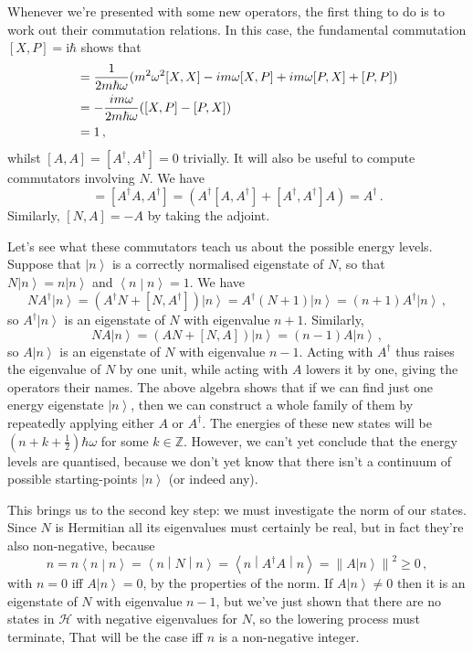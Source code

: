 \documentclass{article}
\theoremstyle{plain}\theoremheaderfont{\normalfont\itshape}\theorembodyfont{\rmfamily}\theoremseparator{.}\newtheorem*{rem}{Remark}\newtheorem*{ex}{Example}\newtheorem*{proof}{Proof}\newtheorem*{altp}{Alternative proof}
\theoremstyle{plain}\theoremheaderfont{\normalfont\bfseries}\theorembodyfont{\rmfamily}\theoremseparator{.}\newtheorem{thm}{Theorem}[section]\newtheorem{lem}[thm]{Lemma}\newtheorem{prop}[thm]{Proposition}\newtheorem*{cor}{Corollary}\newtheorem{defn}[thm]{Definition}\newtheorem{clm}[thm]{Claim}\newtheorem{clminproof}{Claim}
\theoremstyle{break}\theoremheaderfont{\normalfont\itshape}\theorembodyfont{\rmfamily}\theoremseparator{.\medskip}\newtheorem*{proofskip}{Proof}\newtheorem*{exs}{Examples}\newtheorem*{rems}{Remarks}
\theoremstyle{break}\theoremheaderfont{\normalfont\bfseries}\theorembodyfont{\rmfamily}\theoremseparator{.\medskip}\newtheorem{lemskip}[thm]{Lemma}\newtheorem{defnskip}[thm]{Definition}\newtheorem{propskip}[thm]{Proposition}\newtheorem{thmskip}[thm]{Theorem}
\numberwithin{equation}{section}
\newcommand{\ii}{\mathrm{i}}
\newcommand{\ket}[1]{\left| #1 \right\rangle}
\newcommand{\braket}[2]{\left\langle #1 \middle| #2 \right\rangle}
\newcommand{\expval}[2]{\left\langle #2 \middle| #1 \middle| #2 \right\rangle}
\newcommand{\vb}[1]{\bm{\mathrm{#1}}}
\newcommand{\norm}[1]{\left\| #1 \right\|}
\newcommand{\hb}{\mathcal{H}}
\newcommand{\ZZ}{\mathbb{Z}}
\begin{document}
    Whenever we're presented with some new operators, the first thing to do is to work out their commutation relations. In this case, the fundamental commutation \([X,P]=\ii\hbar\) shows that
    \begin{align}
        [A,A^\dagger]&=\frac{1}{2m\hbar\omega}(m^2\omega^2[X,X]-im\omega[X,P]+im\omega[P,X]+[P,P])\notag\\
        &=-\frac{im\omega}{2m\hbar\omega}([X,P]-[P,X])\notag\\
        &=1\,,
    \end{align}
    whilst \([A,A]=[A^\dagger,A^\dagger]=0\) trivially. It will also be useful to compute commutators involving \(N\). We have
    \begin{equation}
        [N,A^\dagger]=[A^\dagger A,A^\dagger]=\left(A^\dagger[A,A^\dagger]+[A^\dagger,A^\dagger]A\right)=A^\dagger\,.
    \end{equation}
    Similarly, \([N,A]=-A\) by taking the adjoint.

    Let's see what these commutators teach us about the possible energy levels. Suppose that \(\ket{n}\) is a correctly normalised eigenstate of \(N\), so that \(N\ket{n}=n\ket{n}\) and \(\braket{n}{n}=1\). We have
    \begin{equation}
        NA^\dagger\ket{n}=(A^\dagger N+[N,A^\dagger])\ket{n}=A^\dagger(N+1)\ket{n}=(n+1)A^\dagger\ket{n}\,,
    \end{equation}
    so \(A^\dagger\ket{n}\) is an eigenstate of \(N\) with eigenvalue \(n+1\). Similarly,
    \begin{equation}
        NA\ket{n}=(AN+[N,A])\ket{n}=(n-1)A\ket{n}\,,
    \end{equation}
    so \(A\ket{n}\) is an eigenstate of \(N\) with eigenvalue \(n-1\). Acting with \(A^\dagger\) thus raises the eigenvalue of \(N\) by one unit, while acting with \(A\) lowers it by one, giving the operators their names. The above algebra shows that if we can find just one energy eigenstate \(\ket{n}\), then we can construct a whole family of them by repeatedly applying either \(A\) or \(A^\dagger\). The energies of these new states will be \((n+k+\frac{1}{2})\hbar\omega\) for some \(k\in\ZZ\). However, we can't yet conclude that the energy levels are quantised, because we don't yet know that there isn't a continuum of possible starting-points \(\ket{n}\) (or indeed any).

    This brings us to the second key step: we must investigate the norm of our states. Since \(N\) is Hermitian all its eigenvalues must certainly be real, but in fact they're also non-negative, because
    \begin{equation}
        n=n\braket{n}{n}=\expval{N}{n}=\expval{A^\dagger A}{n}=\norm{A\ket{n}}^2\ge 0\,,
    \end{equation}
    with \(n=0\) iff \(A\ket{n}=\vb{0}\), by the properties of the norm. If \(A\ket{n}\ne 0\) then it is an eigenstate of \(N\) with eigenvalue \(n-1\), but we've just shown that there are no states in \(\hb\) with negative eigenvalues for \(N\), so the lowering process must terminate, That will be the case iff \(n\) is a non-negative integer.
\end{document}
